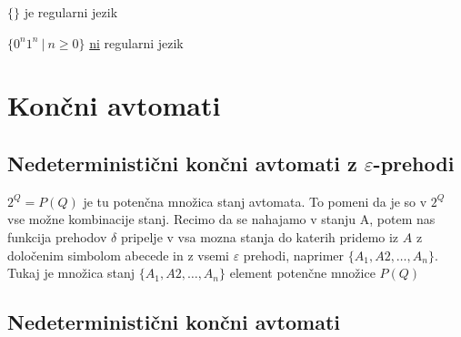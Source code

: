 \documentclass[10pt,a4paper,oneside]{book}
\begin{document}
\begin{primeri}
	\item $ \lbrace \rbrace $ je regularni jezik
	\item $ \lbrace 0^n 1^n \ | \ n \geqslant 0 \rbrace $ \underline{ni} regularni jezik%
\end{primeri}

\section{Končni avtomati}\label{sec:KA}
\subsection{Nedeterministični končni avtomati z $\varepsilon$-prehodi }
$2^Q=P(Q)$ je tu potenčna množica stanj avtomata. To pomeni da je so v $2^Q$ vse možne kombinacije stanj. Recimo da se nahajamo v stanju A, potem nas funkcija prehodov $ \delta $ pripelje v vsa mozna stanja do katerih pridemo iz $A$ z določenim simbolom abecede in z vsemi $ \varepsilon $ prehodi, naprimer $ \lbrace A_1,A2, \ldots , A_n \rbrace$. Tukaj je množica stanj $ \lbrace A_1,A2, \ldots , A_n \rbrace $ element potenčne množice $P(Q)$

\subsection{Nedeterministični končni avtomati}
\end{document}
